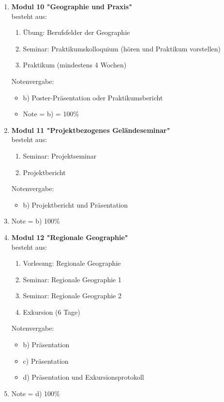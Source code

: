 \begin{enumerate}
 \item \textbf{Modul 10 "Geographie und Praxis"}  \\ besteht aus:
  \begin{enumerate}
   \item Übung: Berufsfelder der Geographie
   \item Seminar: Praktikumskolloquium (hören und Praktikum vorstellen)
   \item Praktikum (mindestens 4 Wochen)
  \end{enumerate}
  Notenvergabe:
  \begin{itemize}
   \item b) Poster-Präsentation oder Praktikumsbericht
   \item Note = b) = 100\%
  \end{itemize}


 \item \textbf{Modul 11 "Projektbezogenes Geländeseminar"}  \\ besteht aus:
  \begin{enumerate}
   \item Seminar: Projektseminar
   \item Projektbericht
  \end{enumerate}
  Notenvergabe:
  \begin{itemize}
    \item b) Projektbericht und Präsentation
   \end{itemize}
   \item[] Note = b) 100\%

 \item \textbf{Modul 12 "Regionale Geographie"}  \\ besteht aus:
  \begin{enumerate}
   \item Vorlesung: Regionale Geographie
   \item Seminar: Regionale Geographie 1
   \item Seminar: Regionale Geographie 2
   \item Exkursion (6 Tage)
  \end{enumerate}
  Notenvergabe:
  \begin{itemize}
   \item b) Präsentation
   \item c) Präsentation
   \item d) Präsentation und Exkursionsprotokoll
  \end{itemize}
  \item[]  Note = d) 100\% 


\end{enumerate}
